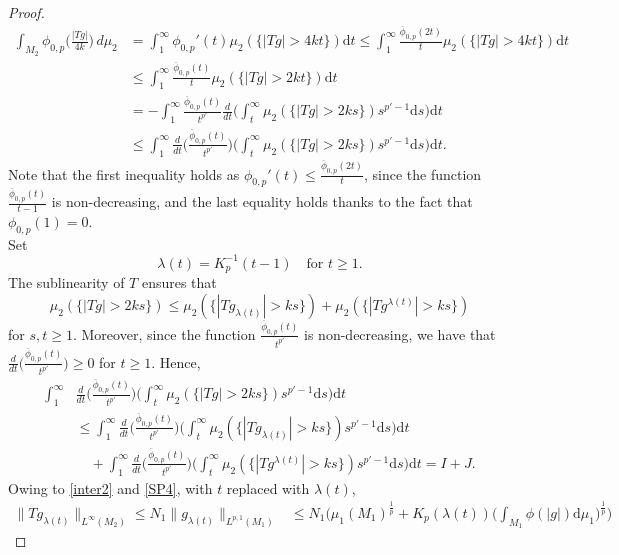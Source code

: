 \documentclass[10pt,a4paper]{amsart}
\def\d{\mathrm{d}}
\begin{document}
\begin{proof}
   \begin{align}
       \label{SP6}
       \int_{M_2}    \phi_{0,p}\Big(\frac{|Tg|}{4k}\Big)\, d\mu_2 & = \int_1^\infty    \phi_{0,p}'(t) \mu_2(\{|Tg|>4kt\})\d t \leq 
       \int_1^\infty  \frac{\overline  \phi_{0,p}(2t)}t \mu_2(\{|Tg|>4kt\})\d t
       \\ \nonumber &
\leq  \int_1^\infty  \frac{\overline  \phi_{0,p}(t)}t \mu_2(\{|Tg|>2kt\})\d t
     \\  \nonumber &  = - \int_1^\infty \frac{ \overline \phi_{0,p}(t)}{t^{p'}} \frac{d}{dt}\bigg(\int_t^\infty \mu_2(\{|Tg|>2ks\})s^{p'-1}\d s\bigg)\d t
     \\  \nonumber &  \leq
     \int_1^\infty \frac{d}{dt}\bigg(\frac{\overline  \phi_{0,p}(t)}{t^{p'}} \bigg)\bigg(\int_t^\infty \mu_2(\{|Tg|>2ks\})s^{p'-1}\d s\bigg)\d t.
   \end{align}
  Note that the first inequality holds as $ \phi_{0,p}'(t)\le\frac{\overline \phi_{0,p}(2t)}{t}$, since the function $\frac{\overline \phi_{0,p}(t)}{t-1}$ is non-decreasing, and    the last equality  holds thanks to the fact that $\phi_{0,p}(1)=0$.
\\Set
   $$\lambda (t)= K_p^{-1}(t-1) \quad \text{for $t \geq 1$.} $$
   The sublinearity of $T$ ensures that
   $$\mu_2(\{|Tg|>2ks\}) \leq \mu_2(\{|Tg_{\lambda(t)}|>ks\})+ \mu_2(\{|Tg^{\lambda(t)}|>ks\})$$
   for   $s,t\geq 1$. Moreover, since the function $\frac{ \overline \phi_{0,p}(t)}{t^{p'}}$ is non-decreasing, we have that $\frac{d}{dt}\Big(\frac{ \overline \phi_{0,p}(t)}{t^{p'}}\Big) \geq 0$ for $t \geq 1$. Hence,
   \begin{align}
       \label{SP7}
        \int_1^\infty & \frac{d}{dt}\bigg(\frac{ \overline \phi_{0,p}(t)}{t^{p'}} \bigg)\bigg(\int_t^\infty \mu_2(\{|Tg|>2ks\})s^{p'-1}\d s\bigg)\d t 
       \\ \nonumber & \leq 
 \int_1^\infty \frac{d}{dt}\bigg(\frac{\overline  \phi_{0,p}(t)}{t^{p'}} \bigg)\bigg(\int_t^\infty \mu_2(\{|Tg_{\lambda(t)}|>ks\})s^{p'-1}\d s\bigg)\d t 
 \\ \nonumber & 
      \quad + \int_1^\infty \frac{d}{dt}\bigg(\frac{ \overline \phi_{0,p}(t)}{t^{p'}} \bigg)\bigg(\int_t^\infty \mu_2(\{|Tg^{\lambda(t)}|>ks\})s^{p'-1}\d s\bigg)\d t = I+J.
   \end{align}
   Owing to \eqref{inter2} and \eqref{SP4}, with $t$ replaced with $\lambda (t)$, 
   \begin{align}
       \label{SP8}
\|Tg_{\lambda(t)}\|_{L^\infty(M_2)}\leq N_1\|g_{\lambda(t)}\|_{L^{p,1}(M_1)}&\leq N_1\bigg(\mu_1(M_1)^{\frac 1p} + K_p(\lambda (t)) \bigg(\int_{M_1}\phi(|g|)\d \mu_1\bigg)^{\frac 1p}\bigg)

\end{align}
\end{proof}
\end{document}
